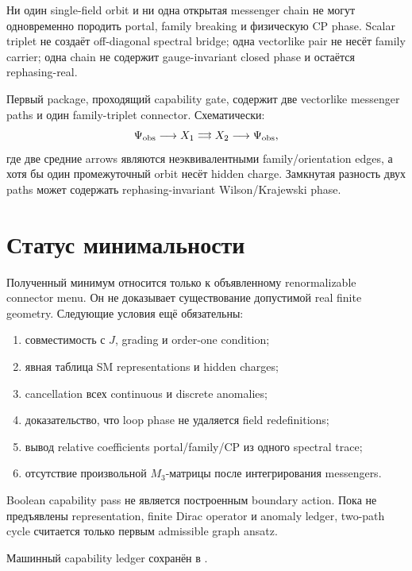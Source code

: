 \begin{theorem}
Ни один single-field orbit и ни одна открытая messenger chain не могут
одновременно породить portal, family breaking и физическую CP phase. Scalar
triplet не создаёт off-diagonal spectral bridge; одна vectorlike pair не
несёт family carrier; одна chain не содержит gauge-invariant closed phase и
остаётся rephasing-real.
\end{theorem}

Первый package, проходящий capability gate, содержит две vectorlike messenger
paths и один family-triplet connector. Схематически:
\begin{equation}
\Psi_{\rm obs}
\longrightarrow X_1
\mathrel{\substack{\longrightarrow\\[-0.6ex]\longrightarrow}}
X_2
\longrightarrow\Psi_{\rm obs},
\end{equation}
где две средние arrows являются неэквивалентными family/orientation edges, а
хотя бы один промежуточный orbit несёт hidden charge. Замкнутая разность двух
paths может содержать rephasing-invariant Wilson/Krajewski phase.

\section{Статус минимальности}

Полученный минимум относится только к объявленному renormalizable connector
menu. Он не доказывает существование допустимой real finite geometry.
Следующие условия ещё обязательны:
\begin{enumerate}
\item совместимость с \(J\), grading и order-one condition;
\item явная таблица SM representations и hidden charges;
\item cancellation всех continuous и discrete anomalies;
\item доказательство, что loop phase не удаляется field redefinitions;
\item вывод relative coefficients portal/family/CP из одного spectral trace;
\item отсутствие произвольной \(M_3\)-матрицы после интегрирования messengers.
\end{enumerate}

\begin{nogocriterion}
Boolean capability pass не является построенным boundary action. Пока не
предъявлены representation, finite Dirac operator и anomaly ledger, two-path
cycle считается только первым admissible graph ansatz.
\end{nogocriterion}

Машинный capability ledger сохранён в
.